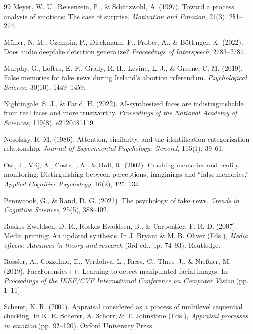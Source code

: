\documentclass[12pt, a4paper]{article}
\begin{document}
\begin{thebibliography}{99}
Meyer, W. U., Reisenzein, R., \& Schützwohl, A. (1997). Toward a process analysis of emotions: The case of surprise. \textit{Motivation and Emotion}, 21(3), 251--274.

Müller, N. M., Czempin, P., Dieckmann, F., Frober, A., \& Böttinger, K. (2022). Does audio deepfake detection generalize? \textit{Proceedings of Interspeech}, 2783--2787.

Murphy, G., Loftus, E. F., Grady, R. H., Levine, L. J., \& Greene, C. M. (2019). False memories for fake news during Ireland's abortion referendum. \textit{Psychological Science}, 30(10), 1449--1459.

Nightingale, S. J., \& Farid, H. (2022). AI-synthesized faces are indistinguishable from real faces and more trustworthy. \textit{Proceedings of the National Academy of Sciences}, 119(8), e2120481119.

Nosofsky, R. M. (1986). Attention, similarity, and the identification-categorization relationship. \textit{Journal of Experimental Psychology: General}, 115(1), 39--61.

Ost, J., Vrij, A., Costall, A., \& Bull, R. (2002). Crashing memories and reality monitoring: Distinguishing between perceptions, imaginings and ``false memories.'' \textit{Applied Cognitive Psychology}, 16(2), 125--134.

Pennycook, G., \& Rand, D. G. (2021). The psychology of fake news. \textit{Trends in Cognitive Sciences}, 25(5), 388--402.

Roskos-Ewoldsen, D. R., Roskos-Ewoldsen, B., \& Carpentier, F. R. D. (2007). Media priming: An updated synthesis. In J. Bryant \& M. B. Oliver (Eds.), \textit{Media effects: Advances in theory and research} (3rd ed., pp. 74--93). Routledge.

Rössler, A., Cozzolino, D., Verdoliva, L., Riess, C., Thies, J., \& Nießner, M. (2019). FaceForensics++: Learning to detect manipulated facial images. In \textit{Proceedings of the IEEE/CVF International Conference on Computer Vision} (pp. 1--11).

Scherer, K. R. (2001). Appraisal considered as a process of multilevel sequential checking. In K. R. Scherer, A. Schorr, \& T. Johnstone (Eds.), \textit{Appraisal processes in emotion} (pp. 92--120). Oxford University Press.


\end{thebibliography}
\end{document}

